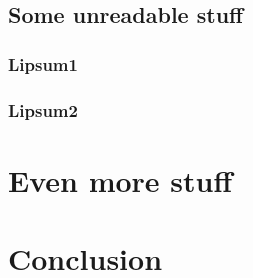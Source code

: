 \documentclass{report}
\begin{document}
    \section{Some unreadable stuff}
    \subsection{Lipsum1}
    \lipsum[12-13]
    \subsection{Lipsum2}

    \chapter{Even more stuff}
    \lipsum[17-25]

    \chapter*{Conclusion}
    \lipsum[26-30]
\end{document}

